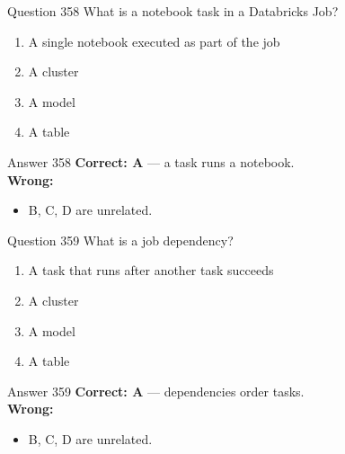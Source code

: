 \documentclass[aspectratio=169,11pt]{beamer}
\begin{document}
	\begin{frame}{Question 358}
		What is a notebook task in a Databricks Job?
		\begin{enumerate}[label=\Alph*.]
			\item A single notebook executed as part of the job
			\item A cluster
			\item A model
			\item A table
		\end{enumerate}
	\end{frame}
	\begin{frame}{Answer 358}
		\textbf{Correct: A} --- a task runs a notebook.\\
		\vspace{0.5em}
		\textbf{Wrong:}
		\begin{itemize}
			\item B, C, D are unrelated.
		\end{itemize}
	\end{frame}
	
	\begin{frame}{Question 359}
		What is a job dependency?
		\begin{enumerate}[label=\Alph*.]
			\item A task that runs after another task succeeds
			\item A cluster
			\item A model
			\item A table
		\end{enumerate}
	\end{frame}
	\begin{frame}{Answer 359}
		\textbf{Correct: A} --- dependencies order tasks.\\
		\vspace{0.5em}
		\textbf{Wrong:}
		\begin{itemize}
			\item B, C, D are unrelated.
		\end{itemize}
	\end{frame}
	
\end{document}
